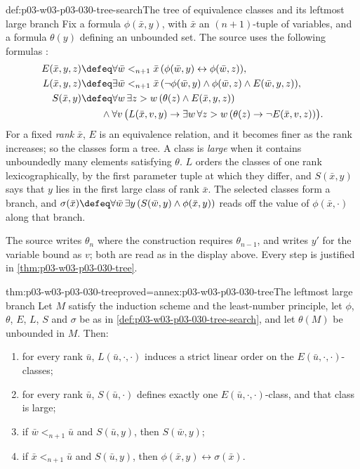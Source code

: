 \begin{hbmethod}{def:p03-w03-p03-030-tree-search}{The tree of equivalence classes and its leftmost large branch}
Fix a formula \(\phi(\bar x,y)\), with \(\bar x\) an \((n+1)\)-tuple of
variables, and a formula \(\theta(y)\) defining an unbounded set.  The source
uses the following formulas \cite[pp.~207--208]{Schmerl1985TransferTheorems}:
\begin{align*}
 E(\bar x,y,z)&\defeq\forall\bar w<_{n+1}\bar x\,
               (\phi(\bar w,y)\leftrightarrow\phi(\bar w,z)),\\
 L(\bar x,y,z)&\defeq\exists\bar w<_{n+1}\bar x\,
     (\neg\phi(\bar w,y)\wedge\phi(\bar w,z)\wedge E(\bar w,y,z)),\\
 S(\bar x,y)&\defeq\forall w\,\exists z>w\,(\theta(z)\wedge E(\bar x,y,z))\\
   &\qquad\wedge\forall v\,\bigl(L(\bar x,v,y)\rightarrow
   \exists w\,\forall z>w\,(\theta(z)\rightarrow\neg E(\bar x,v,z))\bigr).
\end{align*}
For a fixed \emph{rank} \(\bar x\), \(E\) is an equivalence relation, and
it becomes finer as the rank increases; so the classes form a tree.  A class
is \emph{large} when it contains unboundedly many elements satisfying
\(\theta\).  \(L\) orders the classes of one rank lexicographically, by the
first parameter tuple at which they differ, and \(S(\bar x,y)\) says that
\(y\) lies in the first large class of rank \(\bar x\).  The selected classes
form a branch, and \(\sigma(\bar x)\defeq\forall\bar w\,\exists
y\,(S(\bar w,y)\wedge\phi(\bar x,y))\) reads off the value of \(\phi(\bar x,\cdot)\)
along that branch.

The source writes \(\theta_n\) where the construction requires
\(\theta_{n-1}\), and writes \(y'\) for the variable bound as \(v\); both are
read as in the display above.  Every step is justified in
\cref{thm:p03-w03-p03-030-tree}.
\end{hbmethod}

\begin{hblemma}{thm:p03-w03-p03-030-tree}{proved=annex:p03-w03-p03-030-tree}{The leftmost large branch}
Let \(M\) satisfy the induction scheme and the least-number principle, let
\(\phi\), \(\theta\), \(E\), \(L\), \(S\) and \(\sigma\) be as in
\cref{def:p03-w03-p03-030-tree-search}, and let \(\theta(M)\) be unbounded in
\(M\).  Then:
\begin{enumerate}
\item for every rank \(\bar u\), \(L(\bar u,\cdot,\cdot)\) induces a strict
  linear order on the \(E(\bar u,\cdot,\cdot)\)-classes;
\item for every rank \(\bar u\), \(S(\bar u,\cdot)\) defines exactly one
  \(E(\bar u,\cdot,\cdot)\)-class, and that class is large;
\item if \(\bar w<_{n+1}\bar u\) and \(S(\bar u,y)\), then \(S(\bar w,y)\);
\item if \(\bar x<_{n+1}\bar u\) and \(S(\bar u,y)\), then
  \(\phi(\bar x,y)\leftrightarrow\sigma(\bar x)\).
\end{enumerate}
\end{hblemma}

